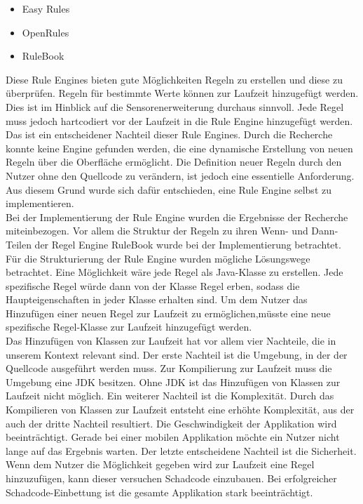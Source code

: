 \begin{itemize}                                                                                                               
	\item Easy Rules \cite{github:easyrules}
	\item OpenRules \cite{openrules}
	\item RuleBook \cite{github:rulebook}
\end{itemize}
Diese Rule Engines bieten gute Möglichkeiten Regeln zu erstellen und diese zu überprüfen. Regeln für bestimmte Werte können zur Laufzeit hinzugefügt werden. Dies ist im Hinblick auf die Sensorenerweiterung durchaus sinnvoll. Jede Regel muss jedoch hartcodiert vor der Laufzeit in die Rule Engine hinzugefügt werden. Das ist ein entscheidener Nachteil dieser Rule Engines. Durch die Recherche konnte keine Engine gefunden werden, die eine dynamische Erstellung von neuen Regeln über die Oberfläche ermöglicht. Die Definition neuer Regeln durch den Nutzer ohne den Quellcode zu verändern, ist jedoch eine essentielle Anforderung. Aus diesem Grund wurde sich dafür entschieden, eine Rule Engine selbst zu implementieren.\\
Bei der Implementierung der Rule Engine wurden die Ergebnisse der Recherche miteinbezogen. Vor allem die Struktur der Regeln zu ihren Wenn- und Dann-Teilen der Regel Engine RuleBook wurde bei der Implementierung betrachtet.\\
Für die Strukturierung der Rule Engine wurden mögliche Lösungswege betrachtet. Eine Möglichkeit wäre jede Regel als Java-Klasse zu erstellen. Jede spezifische Regel würde dann von der Klasse Regel erben, sodass die Haupteigenschaften in jeder Klasse erhalten sind. Um dem Nutzer das Hinzufügen einer neuen Regel zur Laufzeit zu ermöglichen,müsste eine neue spezifische Regel-Klasse zur Laufzeit hinzugefügt werden.\\
Das Hinzufügen von Klassen zur Laufzeit hat vor allem vier Nachteile, die in unserem Kontext relevant sind. Der erste Nachteil ist die Umgebung, in der der Quellcode ausgeführt werden muss. Zur Kompilierung zur Laufzeit muss die Umgebung eine JDK besitzen. Ohne JDK ist das Hinzufügen von Klassen zur Laufzeit nicht möglich. Ein weiterer Nachteil ist die Komplexität. Durch das Kompilieren von Klassen zur Laufzeit entsteht eine erhöhte Komplexität, aus der auch der dritte Nachteil resultiert. Die Geschwindigkeit der Applikation wird beeinträchtigt. Gerade bei einer mobilen Applikation möchte ein Nutzer nicht lange auf das Ergebnis warten. Der letzte entscheidene Nachteil ist die Sicherheit. Wenn dem Nutzer die Möglichkeit gegeben wird zur Laufzeit eine Regel hinzuzufügen, kann dieser versuchen Schadcode einzubauen. Bei erfolgreicher Schadcode-Einbettung ist die gesamte Applikation stark beeinträchtigt.\\
